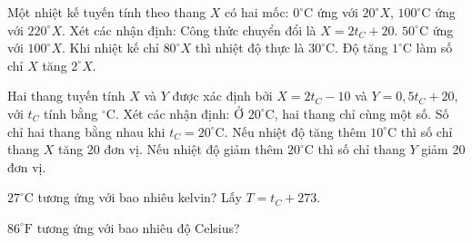 \begin{ex}
Một nhiệt kế tuyến tính theo thang $X$ có hai mốc: $0^\circ\mathrm{C}$ ứng với $20^\circ X$, $100^\circ\mathrm{C}$ ứng với $220^\circ X$. Xét các nhận định:
\choiceTF
{\True Công thức chuyển đổi là $X=2t_C+20$.}
{$50^\circ\mathrm{C}$ ứng với $100^\circ X$.}
{\True Khi nhiệt kế chỉ $80^\circ X$ thì nhiệt độ thực là $30^\circ\mathrm{C}$.}
{\True Độ tăng $1^\circ\mathrm{C}$ làm số chỉ $X$ tăng $2^\circ X$.}
\end{ex}

\begin{ex}
Hai thang tuyến tính $X$ và $Y$ được xác định bởi $X=2t_C-10$ và $Y=0{,}5t_C+20$, với $t_C$ tính bằng $^\circ\mathrm{C}$. Xét các nhận định:
\choiceTF
{\True Ở $20^\circ\mathrm{C}$, hai thang chỉ cùng một số.}
{\True Số chỉ hai thang bằng nhau khi $t_C=20^\circ\mathrm{C}$.}
{\True Nếu nhiệt độ tăng thêm $10^\circ\mathrm{C}$ thì số chỉ thang $X$ tăng 20 đơn vị.}
{Nếu nhiệt độ giảm thêm $20^\circ\mathrm{C}$ thì số chỉ thang $Y$ giảm 20 đơn vị.}
\end{ex}

\begin{ex}
$27^\circ\mathrm{C}$ tương ứng với bao nhiêu kelvin? Lấy $T=t_C+273$.
\end{ex}

\begin{ex}
$86^\circ\mathrm{F}$ tương ứng với bao nhiêu độ Celsius?
\end{ex}

